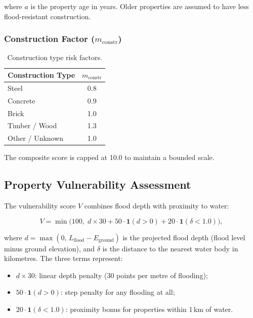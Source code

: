 \documentclass[11pt,a4paper]{article}
\begin{document}
\noindent where $a$ is the property age in years. Older properties are assumed to have less flood-resistant construction.

\subsubsection{Construction Factor ($m_{\text{constr}}$)}

\begin{table}[H]
\centering
\caption{Construction type risk factors.}
\label{tab:constr_factors}
\begin{tabular}{lc}
\toprule
\textbf{Construction Type} & $m_{\text{constr}}$ \\
\midrule
Steel    & 0.8 \\
Concrete & 0.9 \\
Brick    & 1.0 \\
Timber / Wood & 1.3 \\
Other / Unknown & 1.0 \\
\bottomrule
\end{tabular}
\end{table}

\noindent The composite score is capped at 10.0 to maintain a bounded scale.

\subsection{Property Vulnerability Assessment}

The vulnerability score $V$ combines flood depth with proximity to water:

\[
V = \min\!\Big(100,\; d \times 30 + 50 \cdot \mathbf{1}(d > 0) + 20 \cdot \mathbf{1}(\delta < 1.0)\Big),
\]

\noindent where $d = \max(0,\, L_{\text{flood}} - E_{\text{ground}})$ is the projected flood depth (flood level minus ground elevation), and $\delta$ is the distance to the nearest water body in kilometres. The three terms represent:

\begin{itemize}
    \item $d \times 30$: linear depth penalty (30 points per metre of flooding);
    \item $50 \cdot \mathbf{1}(d > 0)$: step penalty for any flooding at all;
    \item $20 \cdot \mathbf{1}(\delta < 1.0)$: proximity bonus for properties within 1\,km of water.
\end{itemize}
\end{document}
